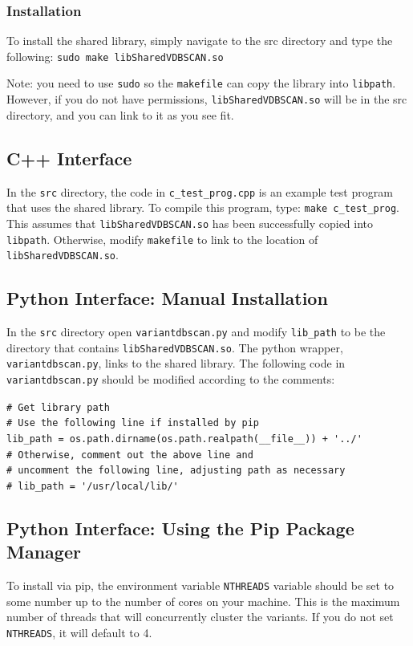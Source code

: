 \documentclass[12pt]{article}
\begin{document}
\subsubsection{Installation}\label{sec:sharedlib_install}
To install the shared library, simply navigate to the src directory and type the following: \verb|sudo make libSharedVDBSCAN.so|

Note: you need to use \texttt{sudo} so the \verb|makefile| can copy the library into \verb|libpath|. However, if you do not have permissions, \verb|libSharedVDBSCAN.so| will be in the src directory, and you can link to it as you see fit. 


\subsection{C++ Interface}\label{ref:cInterfaceInstall}
In the \texttt{src} directory, the code in \verb|c_test_prog.cpp| is an example test program that uses the shared library. To compile this program, type: \verb|make c_test_prog|. This assumes that \verb|libSharedVDBSCAN.so| has been successfully copied into \verb|libpath|.  Otherwise, modify \verb|makefile| to link to the location of \verb|libSharedVDBSCAN.so|.



\subsection{Python Interface: Manual Installation}\label{sec:pymanual}
In the \texttt{src} directory open \texttt{variantdbscan.py} and modify \verb|lib_path| to be the directory that contains \texttt{libSharedVDBSCAN.so}.  The python wrapper, \texttt{variantdbscan.py}, links to the shared library.
The following code in \texttt{variantdbscan.py} should be modified according to the comments:

\noindent \verb|# Get library path|\\
\noindent \verb|# Use the following line if installed by pip|\\
\noindent \verb|lib_path = os.path.dirname(os.path.realpath(__file__)) + '../'|\\
\noindent \verb|# Otherwise, comment out the above line and|\\
\noindent \verb|# uncomment the following line, adjusting path as necessary|\\
\noindent \verb|# lib_path = '/usr/local/lib/'|

\subsection{Python Interface: Using the Pip Package Manager}\label{sec:pypip}
To install via pip, the environment variable \verb|NTHREADS| variable should be set to some number up to the number of cores on your machine.  This is the maximum number of threads that will concurrently cluster the variants. If you do not set \verb|NTHREADS|, it will default to 4. \\
\end{document}
